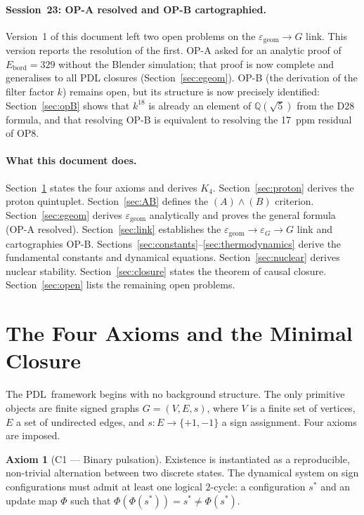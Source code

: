 \documentclass[12pt,a4paper]{article}
\theoremstyle{plain}
\theoremstyle{definition}
\newtheorem{axiom}{Axiom}
\theoremstyle{remark}
\newcommand{\PDL}{\textsc{PDL}}
\newcommand{\Kfour}{K_4}
\newcommand{\egeom}{\varepsilon_{\mathrm{geom}}}
\newcommand{\eG}{\varepsilon_G}
\begin{document}
\paragraph{Session~23: OP-A resolved and OP-B cartographied.} Version~1 of this document left two open problems on the $\egeom \to G$ link. This version reports the resolution of the first. OP-A asked for an analytic proof of $E_{\mathrm{bord}}=329$ without the Blender simulation; that proof is now complete and generalises to all PDL closures (Section~\ref{sec:egeom}). OP-B (the derivation of the filter factor $k$) remains open, but its structure is now precisely identified: Section~\ref{sec:opB} shows that $k^{18}$ is already an element of $\mathbb{Q}(\sqrt{5})$ from the D28 formula, and that resolving OP-B is equivalent to resolving the 17~ppm residual of OP8.

\paragraph{What this document does.} Section~\ref{sec:axioms} states the four axioms and derives $\Kfour$. Section~\ref{sec:proton} derives the proton quintuplet. Section~\ref{sec:AB} defines the $(A)\wedge(B)$ criterion. Section~\ref{sec:egeom} derives $\egeom$ analytically and proves the general formula (OP-A resolved). Section~\ref{sec:link} establishes the $\egeom \to \eG \to G$ link and cartographies OP-B. Sections~\ref{sec:constants}--\ref{sec:thermodynamics} derive the fundamental constants and dynamical equations. Section~\ref{sec:nuclear} derives nuclear stability. Section~\ref{sec:closure} states the theorem of causal closure. Section~\ref{sec:open} lists the remaining open problems.

\section{The Four Axioms and the Minimal Closure}
\label{sec:axioms}

The \PDL\ framework begins with no background structure. The only primitive objects are finite signed graphs $G=(V,E,s)$, where $V$ is a finite set of vertices, $E$ a set of undirected edges, and $s\colon E\to\{+1,-1\}$ a sign assignment. Four axioms are imposed.

\begin{axiom}[C1 --- Binary pulsation]
Existence is instantiated as a reproducible, non-trivial alternation between two discrete states. The dynamical system on sign configurations must admit at least one logical $2$-cycle: a configuration $s^*$ and an update map $\Phi$ such that $\Phi(\Phi(s^*))=s^*\neq\Phi(s^*)$.
\end{axiom}
\end{document}
